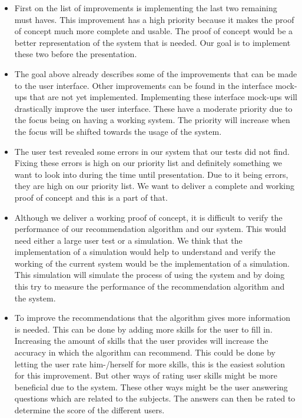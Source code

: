\begin{itemize}
\item First on the list of improvements is implementing the last two remaining must haves.
This improvement has a high priority because it makes the proof of concept much more complete and usable.
The proof of concept would be a better representation of the system that is needed.
Our goal is to implement these two before the presentation.

\item The goal above already describes some of the improvements that can be made to the user interface.
Other improvements can be found in the interface mock-ups that are not yet implemented.
Implementing these interface mock-ups will drastically improve the user interface.
These have a moderate priority due to the focus being on having a working system.
The priority will increase when the focus will be shifted towards the usage of the system.

\item The user test revealed some errors in our system that our tests did not find.
Fixing these errors is high on our priority list and definitely something we want to look into during the time until presentation.
Due to it being errors, they are high on our priority list.
We want to deliver a complete and working proof of concept and this is a part of 
that.

\item Although we deliver a working proof of concept, it is difficult to verify the performance of our recommendation algorithm and our system.
This would need either a large user test or a simulation.
We think that the implementation of a simulation would help to understand and verify the working of the current system would be the implementation of a simulation.
This simulation will simulate the process of using the system and by doing this try to measure the performance of the recommendation algorithm and the system.

\item To improve the recommendations that the algorithm gives more information is needed.
This can be done by adding more skills for the user to fill in.
Increasing the amount of skills that the user provides will increase the accuracy in which the algorithm can recommend.
This could be done by letting the user rate him-/herself for more skills, this is the easiest solution for this improvement.
But other ways of rating user skills might be more beneficial due to the system.
These other ways might be the user answering questions which are related to the subjects.
The answers can then be rated to determine the score of the different users.


\end{itemize}
